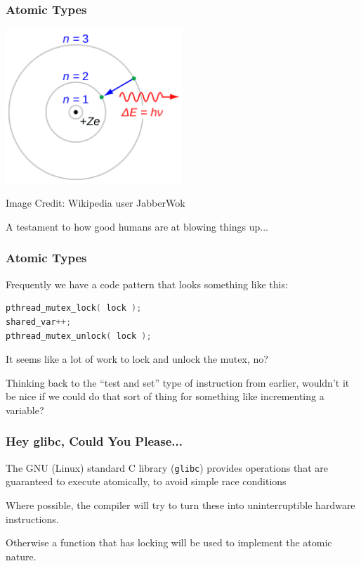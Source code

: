 \begin{frame}
	\frametitle{Atomic Types}
	\begin{center}
		\includegraphics[width=0.5\textwidth]{images/bohrmodel.png}
	\end{center}
	\hfill Image Credit: Wikipedia user JabberWok

	A testament to how good humans are at blowing things up...

\end{frame}



\begin{frame}[fragile]
	\frametitle{Atomic Types}

	Frequently we have a code pattern that looks something like this:

	\begin{lstlisting}[language=C]
pthread_mutex_lock( lock );
shared_var++;
pthread_mutex_unlock( lock );
\end{lstlisting}

	It seems like a lot of work to lock and unlock the mutex, no?

	Thinking back to the ``test and set'' type of instruction from earlier, wouldn't it be nice if we could do that sort of thing for something like incrementing a variable?

\end{frame}

\begin{frame}
	\frametitle{Hey glibc, Could You Please...}

The GNU (Linux) standard C library (\texttt{glibc}) provides operations that are guaranteed to execute atomically, to avoid simple race conditions

	Where possible, the compiler will try to turn these into uninterruptible hardware instructions.
	
	Otherwise a function that has locking will be used to implement the atomic nature.
\end{frame}

